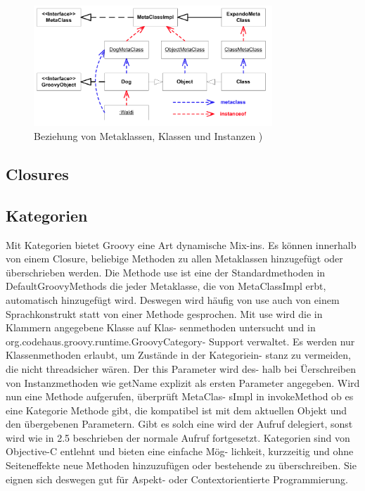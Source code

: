 \documentclass[11pt,english,ngerman, headsepline]{scrreprt}
\begin{document}
\begin{figure}[h!]
	\begin{center}
	\includegraphics[width=0.8\textwidth]{pics/groovyMetaklassen}
	\end{center}
	\caption{Beziehung von Metaklassen, Klassen und Instanzen \cite{mpInGroovy})}
	\label{groovyMetaclassDiagram}
\end{figure}




\subsection{Closures} 


\subsection{Kategorien}
Mit Kategorien bietet Groovy eine Art dynamische Mix-ins. Es können innerhalb
von einem Closure, beliebige Methoden zu allen Metaklassen hinzugefügt oder
überschrieben werden.
Die Methode use ist eine der Standardmethoden in DefaultGroovyMethods die jeder
Metaklasse, die von MetaClassImpl erbt, automatisch hinzugefügt wird. Deswegen
wird häufig von use auch von einem Sprachkonstrukt statt von einer Methode
gesprochen. Mit use wird die in Klammern angegebene Klasse auf Klas- senmethoden
untersucht und in org.codehaus.groovy.runtime.GroovyCategory- Support verwaltet.
Es werden nur Klassenmethoden erlaubt, um Zustände in der Kategoriein- stanz zu
vermeiden, die nicht threadsicher wären. Der this Parameter wird des- halb bei
Üerschreiben von Instanzmethoden wie getName explizit als ersten Parameter
angegeben. Wird nun eine Methode aufgerufen, überprüft MetaClas- sImpl in
invokeMethod ob es eine Kategorie Methode gibt, die kompatibel ist mit dem
aktuellen Objekt und den übergebenen Parametern. Gibt es solch eine wird der
Aufruf delegiert, sonst wird wie in 2.5 beschrieben der normale Aufruf
fortgesetzt.
Kategorien sind von Objective-C entlehnt und bieten eine einfache Mög-
lichkeit, kurzzeitig und ohne Seiteneffekte neue Methoden hinzuzufügen oder
bestehende zu überschreiben. Sie eignen sich deswegen gut für Aspekt- oder
Contextorientierte Programmierung. \cite{mpInGroovy}
\end{document}
